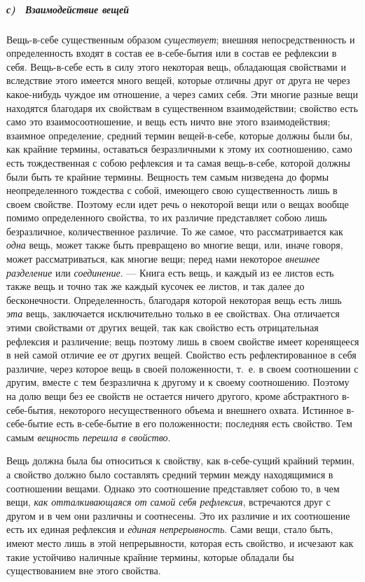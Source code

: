 \subparagraph[с) \ Взаимодействие вещей]{с) \ Взаимодействие вещей}
Вещь-в-себе существенным образом
{\em существует}; внешняя непосредственность и
определенность входят в состав ее в-себе-бытия или в состав ее рефлексии в
себя. Вещь-в-себе есть в силу этого некоторая вещь, обладающая свойствами и
вследствие этого имеется много вещей, которые отличны друг от друга не
через какое-нибудь чуждое им отношение, а через самих себя. Эти многие
разные вещи находятся благодаря их свойствам в существенном взаимодействии;
свойство есть само это взаимосоотношение, и вещь есть ничто вне этого
взаимодействия; взаимное определение, средний термин вещей-в-себе, которые
должны были бы, как крайние термины, оставаться безразличными к этому их
соотношению, само есть тождественная с собою рефлексия и та самая
вещь-в-себе, которой должны были быть те крайние термины. Вещность тем
самым низведена до формы неопределенного тождества с собой, имеющего свою
существенность лишь в своем свойстве. Поэтому если идет речь о некоторой
вещи или о вещах вообще помимо определенного свойства, то их различие
представляет собою лишь безразличное, количественное различие. То же самое,
что рассматривается как {\em одна} вещь, может также
быть превращено во многие вещи, или, иначе говоря, может рассматриваться,
как многие вещи; перед нами некоторое {\em внешнее
разделение} или {\em соединение}. — Книга есть вещь, и
каждый из ее листов есть также вещь и точно так же каждый кусочек ее
листов, и так далее до бесконечности. Определенность, благодаря которой
некоторая вещь есть лишь {\em эта} вещь, заключается
исключительно только в ее свойствах. Она отличается этими свойствами от
других вещей, так как свойство есть отрицательная рефлексия и различение;
вещь поэтому лишь в своем свойстве имеет коренящееся в ней самой отличие ее
от других вещей. Свойство есть рефлектированное в себя различие, через
которое вещь в своей положенности, т.~е. в своем соотношении с другим,
вместе с тем безразлична к другому и к своему соотношению. Поэтому на долю
вещи без ее свойств не остается ничего другого, кроме абстрактного
в-себе-бытия, некоторого несущественного объема и внешнего охвата. Истинное
в-себе-бытие есть в-себе-бытие в его положенности; последняя есть свойство.
Тем самым {\em вещность перешла в свойство}.

Вещь должна была бы относиться к свойству, как в-себе-сущий крайний термин,
а свойство должно было составлять средний термин между находящимися в
соотношении вещами. Однако это соотношение представляет собою то, в чем
вещи, {\em как отталкивающаяся от самой себя
рефлексия}, встречаются друг с другом и в чем они различны и соотнесены.
Это их различие и их соотношение есть их единая рефлексия и
{\em единая непрерывность}. Сами вещи, стало быть,
имеют место лишь в этой непрерывности, которая есть свойство, и исчезают
как такие устойчиво наличные крайние термины, которые обладали бы
существованием вне этого свойства.

